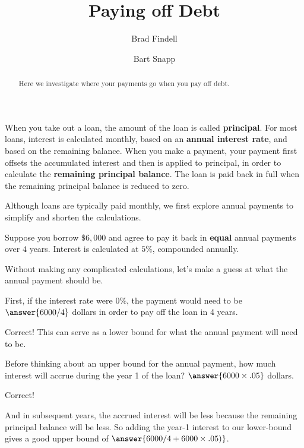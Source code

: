 \documentclass[handout,space,nooutcomes]{ximera}
\title{Paying off Debt}
\author{Brad Findell \and Bart Snapp}
\begin{document}
\begin{abstract}
Here we investigate where your payments go when you pay off debt.
\end{abstract}
\maketitle

When you take out a loan, the amount of the loan is called
\textbf{principal}.  For most loans, interest is calculated monthly,
based on an \textbf{annual interest rate}, and based on the remaining
balance.  When you make a payment, your payment first offsets the
accumulated interest and then is applied to principal, in order to
calculate the \textbf{remaining principal balance}.  The loan is paid
back in full when the remaining principal balance is reduced to zero.


Although loans are typically paid monthly, we first explore annual payments to simplify and shorten the calculations.  

\begin{question}[2.5in]
Suppose you borrow $\$6,000$ and agree to pay it back in \textbf{equal} annual
payments over $4$ years.  Interest is calculated at $5\%$,
compounded annually. 

Without making any complicated calculations, let's make a guess at what the annual payment should be.  

First, if the interest rate were $0\%$, the payment would need to be $\answer{6000/4}$ dollars in order to pay off the loan in 4 years.  

\begin{question}
Correct!  This can serve as a lower bound for what the annual payment will need to be.  

Before thinking about an upper bound for the annual payment, how much interest will accrue during the year 1 of the loan?  
$\answer{6000\times.05}$ dollars.  

\begin{question}
Correct!  

And in subsequent years, the accrued interest will be less because the remaining principal balance will be less.  
So adding the year-1 interest to our lower-bound gives a good upper bound of $\answer{6000/4 + 6000\times.05)}$.  
 
\end{question}
\end{question}
\end{question}
\end{document}
